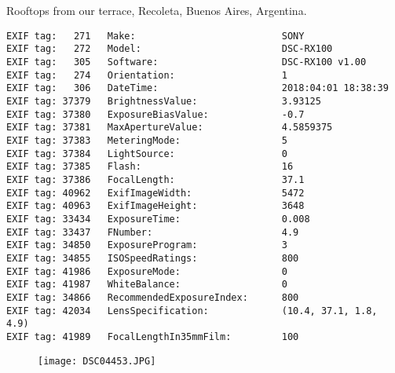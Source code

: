 \section{\protect{}}
\noindent Rooftops from our terrace, Recoleta, Buenos Aires, Argentina.
\noindent
\begin{lstlisting}
EXIF tag:   271   Make:                          SONY
EXIF tag:   272   Model:                         DSC-RX100
EXIF tag:   305   Software:                      DSC-RX100 v1.00
EXIF tag:   274   Orientation:                   1
EXIF tag:   306   DateTime:                      2018:04:01 18:38:39
EXIF tag: 37379   BrightnessValue:               3.93125
EXIF tag: 37380   ExposureBiasValue:             -0.7
EXIF tag: 37381   MaxApertureValue:              4.5859375
EXIF tag: 37383   MeteringMode:                  5
EXIF tag: 37384   LightSource:                   0
EXIF tag: 37385   Flash:                         16
EXIF tag: 37386   FocalLength:                   37.1
EXIF tag: 40962   ExifImageWidth:                5472
EXIF tag: 40963   ExifImageHeight:               3648
EXIF tag: 33434   ExposureTime:                  0.008
EXIF tag: 33437   FNumber:                       4.9
EXIF tag: 34850   ExposureProgram:               3
EXIF tag: 34855   ISOSpeedRatings:               800
EXIF tag: 41986   ExposureMode:                  0
EXIF tag: 41987   WhiteBalance:                  0
EXIF tag: 34866   RecommendedExposureIndex:      800
EXIF tag: 42034   LensSpecification:             (10.4, 37.1, 1.8, 4.9)
EXIF tag: 41989   FocalLengthIn35mmFilm:         100

\end{lstlisting}
\clearpage
\begin{figure}
\raggedleft
\texttt{[image: DSC04453.JPG]}
\end{figure}


\clearpage
